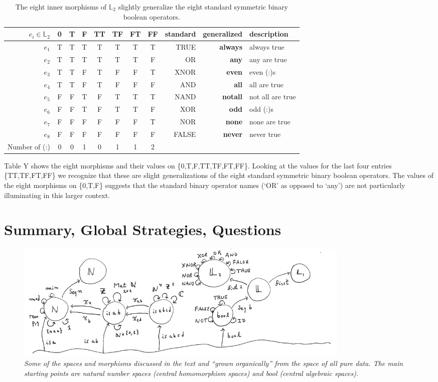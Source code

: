 \documentclass[11pt]{article}
\begin{document}
\begin{table}
\caption{The eight inner morphisms of ${\mathbb L}_2$ slightly generalize the eight standard symmetric binary boolean operators.}
\centering 
\begin{tabular}{r c c c c c c c r r l}
\hline\hline
$e_i \in {\mathbb L}_2$ & 0 & T & F & TT & TF & FT & FF & standard & generalized & description \\ [0.5ex] 
\hline
$e_1$  & T & T & T & T & T & T & T & TRUE & {\bf always} & always true \\
$e_2$  & T & T & T & T & T & T & F & OR & {\bf any} & any are true \\
$e_3$  & T & T & F & T & F & F & T & XNOR & {\bf even} & even (:)s \\
$e_4$ & T & T & F & T & F & F & F & AND & {\bf all} & all are true \\
$e_5$ & F & F & T & F & T & T & T & NAND & {\bf notall} & not all are true \\
$e_6$ & F & F & T & F & T & T & F & XOR & {\bf odd} & odd (:)s \\
$e_7$ & F & F & F & F & F & F & T & NOR & {\bf none} & none are true  \\
$e_8$ & F & F & F & F & F & F & F & FALSE & {\bf never} & never true \\
\hline
Number of (:)   & 0 & 0 & 1 & 0 & 1 & 1 & 2 &  \\ 
\hline
\end{tabular}
\label{table:L2}
\end{table} 

Table Y shows the eight morphisms and their values on \{0,T,F,TT,TF,FT,FF\}.  Looking at the values for the last four entries \{TT,TF,FT,FF\} 
we recognize that these are slight generalizations of the eight standard symmetric binary boolean operators.  The values of the eight morphisms 
on \{0,T,F\} suggests that the standard binary operator names (`OR' as opposed to `any') are not particularly illuminating in this larger context.  

\section{Summary, Global Strategies, Questions} 


\begin{figure}[h]
\centering
\includegraphics[width=0.8\textwidth]{garden.png}
\caption{{\it Some of the spaces and morphisms discussed in the text and ``grown organically'' from the space of all pure data. 
The main starting points are natural number spaces (central homomorphism spaces) and bool (central algebraic spaces).}}
\end{figure}
\end{document}
